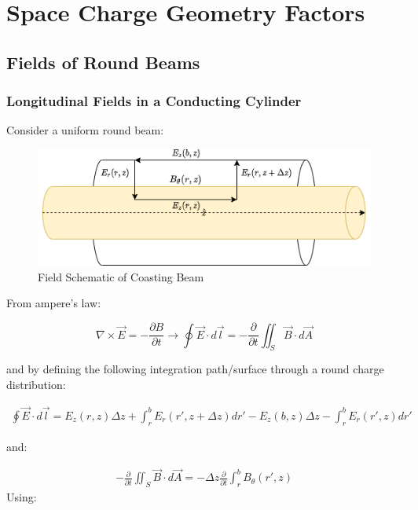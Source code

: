 \appendix

\chapter{Space Charge Geometry Factors}

\section{Fields of Round Beams}

\subsection{Longitudinal Fields in a Conducting Cylinder}

Consider a uniform round beam:

\begin{figure}
    \centering
    \includegraphics{figs/amperian_surface.png}
    \caption{Field Schematic of Coasting Beam}

\end{figure}

From ampere's law:

$$\nabla \times \vec{E} = -\frac{\partial B}{\partial t} \to \oint \vec{E}\cdot d\vec{l} = -\frac{\partial}{\partial t}\iint_S\vec{B}\cdot d\vec{A}$$

and by defining the following integration path/surface through a round charge distribution:

$$\begin{aligned}
        \oint \vec{E}\cdot d\vec{l} = E_z(r,z)\Delta z + \int_r^bE_r(r', z+\Delta z)dr'-E_z(b, z)\Delta z -\int_r^bE_r(r', z)dr'
    \end{aligned}$$

and:

$$\begin{aligned}
        -\frac{\partial}{\partial t}\iint_S\vec{B}\cdot d\vec{A} = -\Delta z \frac{\partial}{\partial t}\int_r^bB_{\theta}(r', z)
    \end{aligned}$$
Using:

